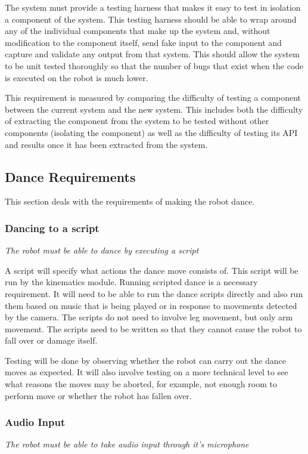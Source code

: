 \documentclass[english,12pt]{scrartcl}
\newcommand{\requirement}[1]{\textit{#1}}
\begin{document}
				The system must provide a testing harness that makes it easy to test in isolation a
				component of the system. This testing harness should be able to wrap around any of the
				individual components that make up the system and, without modification to the component
				itself, send fake input to the component and capture and validate any output from that
				system. This should allow the system to be unit tested thoroughly so that the number
				of bugs that exist when the code is executed on the robot is much lower.
	
				This requirement is measured by comparing the difficulty of testing a component between
				the current system and the new system. This includes both the difficulty of extracting
				the component from the system to be tested without other components (isolating the
				component) as well as the difficulty of testing its API and results once it has been
				extracted from the system.
		\subsection{Dance Requirements}
		This section deals with the requirements of making the robot dance. 
			\subsubsection{Dancing to a script}
				\requirement{The robot must be able to dance by executing a script}

				A script will specify what actions the dance move consists of.
				This script will be run by the kinematics module. Running scripted dance is a necessary requirement.
				It will need to be able to run the dance scripts directly and also run them based on music that is being played or in response to movements detected by the camera.
				The scripts do not need to involve leg movement, but only arm movement.
				The scripts need to be written so that they cannot cause the robot to fall over or damage itself.
								
				Testing will be done by observing whether the robot can carry out the dance moves as expected.
				It will also involve testing on a more technical level to see what reasons the moves may be aborted, for example, not enough room to perform move or whether the robot has fallen over.

			\subsubsection{Audio Input}
				\requirement{The robot must be able to take audio input through it's microphone}
\end{document}
